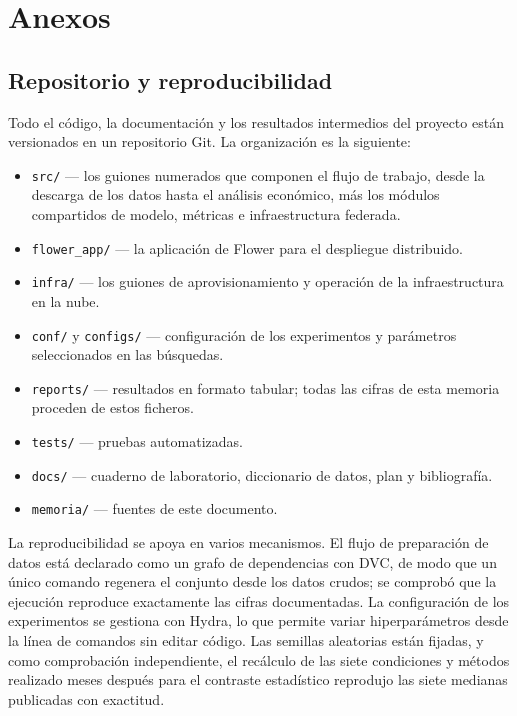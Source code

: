 \chapter{Anexos}
\label{cap:anexos}

\section{Repositorio y reproducibilidad}

Todo el código, la documentación y los resultados intermedios del proyecto están versionados en un
repositorio Git. La organización es la siguiente:

\begin{itemize}
  \item \texttt{src/} — los guiones numerados que componen el flujo de trabajo, desde la descarga
    de los datos hasta el análisis económico, más los módulos compartidos de modelo, métricas e
    infraestructura federada.
  \item \texttt{flower\_app/} — la aplicación de Flower para el despliegue distribuido.
  \item \texttt{infra/} — los guiones de aprovisionamiento y operación de la infraestructura en la
    nube.
  \item \texttt{conf/} y \texttt{configs/} — configuración de los experimentos y parámetros
    seleccionados en las búsquedas.
  \item \texttt{reports/} — resultados en formato tabular; todas las cifras de esta memoria
    proceden de estos ficheros.
  \item \texttt{tests/} — pruebas automatizadas.
  \item \texttt{docs/} — cuaderno de laboratorio, diccionario de datos, plan y bibliografía.
  \item \texttt{memoria/} — fuentes de este documento.
\end{itemize}

La reproducibilidad se apoya en varios mecanismos. El flujo de preparación de datos está declarado
como un grafo de dependencias con DVC, de modo que un único comando regenera el conjunto desde los
datos crudos; se comprobó que la ejecución reproduce exactamente las cifras documentadas. La
configuración de los experimentos se gestiona con Hydra, lo que permite variar hiperparámetros desde
la línea de comandos sin editar código. Las semillas aleatorias están fijadas, y como comprobación
independiente, el recálculo de las siete condiciones y métodos realizado meses después para el
contraste estadístico reprodujo las siete medianas publicadas con exactitud.

